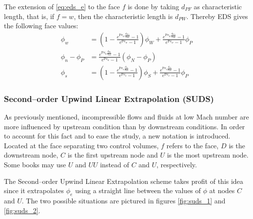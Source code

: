 The extension of \eqref{eq:eds_e} to the face $f$ is done by taking $d_{PF}$ as characteristic length, that is, if $f = w$, then the characteristic length is $d_{PW}$. Thereby EDS gives the following face values:
\begin{align}
	\phi_w &= 
	\left( 1 - \frac{e^{\mathrm{Pe}_w \frac{d_{Ww}}{d_{PW}}} - 1}{e^{\mathrm{Pe}_w} - 1} \right)
	 \phi_W + 
	\frac{e^{\mathrm{Pe}_w \frac{d_{Ww}}{d_{PW}}} - 1}{e^{\mathrm{Pe}_w} - 1} \phi_P \\
	\phi_n - \phi_P &= 
	\frac{e^{\mathrm{Pe}_n \frac{d_{Pn}}{d_{PN}}} - 1}{e^{\mathrm{Pe}_n} - 1} (\phi_N - \phi_P) \\
	\phi_s &= 
	\left( 1 - \frac{e^{\mathrm{Pe}_s \frac{d_{Ss}}{d_{PS}}} - 1}{e^{\mathrm{Pe}_s} - 1} \right)
	\phi_S + 
	\frac{e^{\mathrm{Pe}_s \frac{d_{Ss}}{d_{PS}}} - 1}{e^{\mathrm{Pe}_s} - 1} \phi_P
	\label{eq:eds_s}	
\end{align}

\subsubsection{Second--order Upwind Linear Extrapolation (SUDS)}

As previously mentioned, incompressible flows and fluids at low Mach number are more influenced by upstream condition than by downstream conditions. In order to account for this fact and to ease the study, a new notation is introduced. Located at the face separating two control volumes, $f$ refers to the face, $D$ is the downstream node, $C$ is the first upstream node and $U$ is the most upstream node. Some books may use $U$ and $UU$ instead of $C$ and $U$, respectively.

The Second--order Upwind Linear Extrapolation scheme takes profit of this idea since it extrapolates $\phi_e$ using a straight line between the values of $\phi$ at nodes $C$ and $U$. The two possible situations are pictured in figures \ref{fig:suds_1} and \ref{fig:suds_2}.

